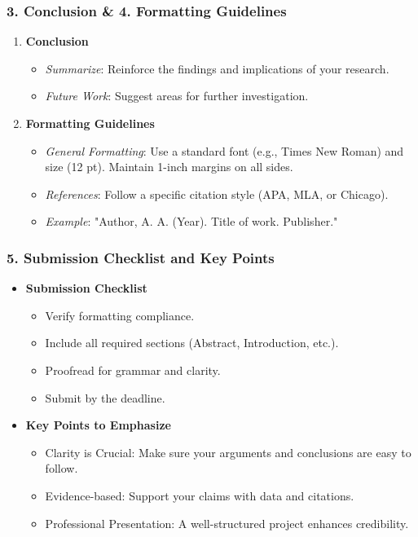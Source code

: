 \documentclass[aspectratio=169]{beamer}
\begin{document}
\begin{frame}[fragile]
    \frametitle{3. Conclusion \& 4. Formatting Guidelines}
    
    \begin{enumerate}
        \item \textbf{Conclusion}
        \begin{itemize}
            \item \textit{Summarize}: Reinforce the findings and implications of your research.
            \item \textit{Future Work}: Suggest areas for further investigation.
        \end{itemize}
        
        \item \textbf{Formatting Guidelines}
        \begin{itemize}
            \item \textit{General Formatting}: Use a standard font (e.g., Times New Roman) and size (12 pt). Maintain 1-inch margins on all sides.
            \item \textit{References}: Follow a specific citation style (APA, MLA, or Chicago).
            \item \textit{Example}: "Author, A. A. (Year). Title of work. Publisher."
        \end{itemize}
    \end{enumerate}
\end{frame}

\begin{frame}[fragile]
    \frametitle{5. Submission Checklist and Key Points}
    
    \begin{itemize}
        \item \textbf{Submission Checklist}
        \begin{itemize}
            \item Verify formatting compliance.
            \item Include all required sections (Abstract, Introduction, etc.).
            \item Proofread for grammar and clarity.
            \item Submit by the deadline.
        \end{itemize}
        
        \item \textbf{Key Points to Emphasize}
        \begin{itemize}
            \item Clarity is Crucial: Make sure your arguments and conclusions are easy to follow.
            \item Evidence-based: Support your claims with data and citations.
            \item Professional Presentation: A well-structured project enhances credibility.
        \end{itemize}
    \end{itemize}
\end{frame}
\end{document}
